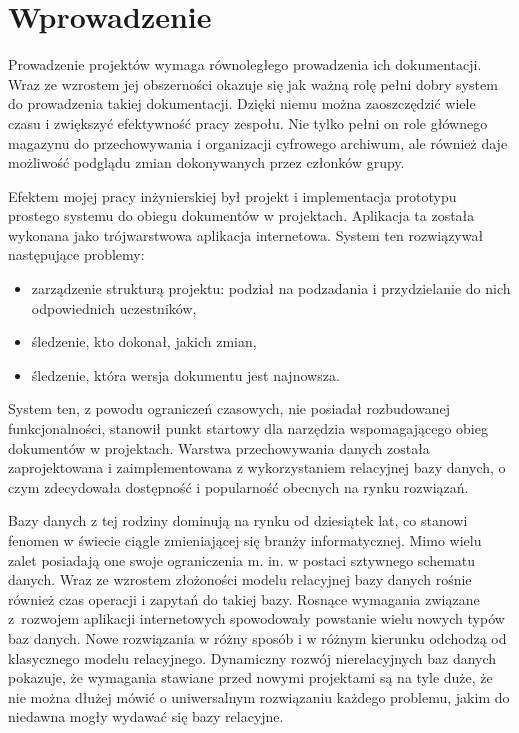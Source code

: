 \chapter{Wprowadzenie}

Prowadzenie projektów wymaga równoległego prowadzenia ich dokumentacji. 
Wraz ze wzrostem jej obszerności okazuje się jak ważną rolę pełni dobry system do prowadzenia takiej dokumentacji.
Dzięki niemu można zaoszczędzić wiele czasu i zwiększyć efektywność pracy zespołu.
Nie tylko pełni on role głównego magazynu do przechowywania i organizacji cyfrowego archiwum, ale również daje możliwość podglądu zmian dokonywanych przez członków grupy.

Efektem mojej pracy inżynierskiej był projekt i implementacja prototypu prostego systemu do obiegu dokumentów w projektach. 
Aplikacja ta została wykonana jako trójwarstwowa aplikacja internetowa.
System ten rozwiązywał następujące problemy:
\begin{itemize}
    \item zarządzenie strukturą projektu: podział na podzadania i przydzielanie do nich odpowiednich uczestników,
    \item śledzenie, kto dokonał, jakich zmian,
    \item śledzenie, która wersja dokumentu jest najnowsza.
\end{itemize}

System ten, z powodu ograniczeń czasowych, nie posiadał rozbudowanej funkcjonalności, stanowił punkt startowy dla narzędzia wspomagającego obieg dokumentów w projektach.
Warstwa przechowywania danych została zaprojektowana i zaimplementowana z wykorzystaniem relacyjnej bazy danych, o czym zdecydowała dostępność i popularność obecnych na rynku rozwiązań. 

Bazy danych z tej rodziny dominują na rynku od dziesiątek lat, co stanowi fenomen w świecie ciągle zmieniającej się branży informatycznej. 
Mimo wielu zalet posiadają one swoje ograniczenia m. in. w postaci sztywnego schematu danych.
Wraz ze wzrostem złożoności modelu relacyjnej bazy danych rośnie również czas operacji i zapytań do takiej bazy.
Rosnące wymagania związane z~rozwojem aplikacji internetowych spowodowały powstanie wielu nowych typów baz danych.
Nowe rozwiązania w różny sposób i w różnym kierunku odchodzą od klasycznego modelu relacyjnego.
Dynamiczny rozwój nierelacyjnych baz danych pokazuje, że wymagania stawiane przed nowymi projektami są na tyle duże, że nie można dłużej mówić o uniwersalnym rozwiązaniu każdego problemu, jakim do niedawna mogły wydawać się bazy relacyjne.

